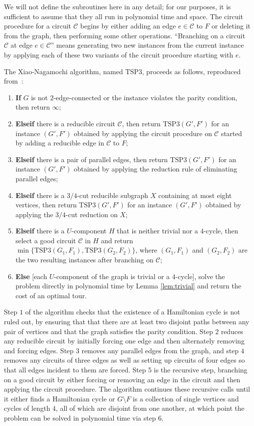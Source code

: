 We will not define the subroutines here in any detail; for our purposes, it is sufficient to assume that they all run in polynomial time and space. The circuit procedure for a circuit $\mathcal{C}$ begins by either adding an edge $e \in \mathcal{C}$ to $F$ or deleting it from the graph, then performing some other operations. ``Branching on a circuit $\mathcal{C}$ at edge $e \in \mathcal{C}$'' means generating two new instances from the current instance by applying each of these two variants of the circuit procedure starting with $e$.

The Xiao-Nagamochi algorithm, named $\text{TSP3}$, proceeds as follows, reproduced from~\cite{xiao2016degree3}:

\begin{enumerate}
\item {\bf If} $G$ is not $2$-edge-connected or the instance violates the parity condition, then return $\infty$;
\item {\bf Elseif} there is a reducible circuit $\mathcal{C}$, then return $\text{TSP3}(G', F')$ for an instance $(G',F')$ obtained by applying the circuit procedure on $\mathcal{C}$ started by adding a reducible edge in $\mathcal{C}$ to $F$;
\item {\bf Elseif} there is a pair of parallel edges, then return $\text{TSP3}(G',F')$ for an instance $(G',F')$ obtained by applying the reduction rule of eliminating parallel edges;
\item {\bf Elseif} there is a $3/4$-cut reducible subgraph $X$ containing at most eight vertices, then return $\text{TSP3}(G',F')$ for an instance $(G',F')$ obtained by applying the $3/4$-cut reduction on $X$;
\item {\bf Elseif} there is a $U$-component $H$ that is neither trivial nor a $4$-cycle, then select a good circuit $\mathcal{C}$ in $H$ and return $\min\{\text{TSP3}(G_1,F_1), \text{TSP3}(G_2,F_2)\}$, where $(G_1,F_1)$ and $(G_2,F_2)$ are the
two resulting instances after branching on $\mathcal{C}$;
\item {\bf Else} [each $U$-component of the graph is trivial or a $4$-cycle], solve the problem directly in polynomial time by Lemma \ref{lem:trivial} and return the cost of an optimal tour.
\end{enumerate}

Step $1$ of the algorithm checks that the existence of a Hamiltonian cycle is not ruled out, by ensuring that that there are at least two disjoint paths between any pair of vertices and that the graph satisfies the parity condition. Step 2 reduces any reducible circuit by initially forcing one edge and then alternately removing and forcing edges. Step $3$ removes any parallel edges from the graph, and step $4$ removes any circuits of three edges as well as setting up circuits of four edges so that all edges incident to them are forced. Step 5 is the recursive step, branching on a good circuit by either forcing or removing an edge in the circuit and then applying the circuit procedure. The algorithm continues these recursive calls until it either finds a Hamiltonian cycle or $G \setminus F$ is a collection of single vertices and cycles of length $4$, all of which are disjoint from one another, at which point the problem can be solved in polynomial time via step $6$.

